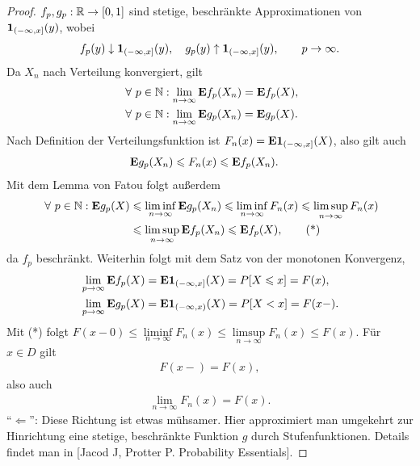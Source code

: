 \begin{proof}
$f_p,g_p: \mathbb{R}\to[0,1]$ sind stetige, beschränkte Approximationen von
$\mathbf{1}_{(-\infty,x]}(y)$, wobei
\begin{align*}
f_p(y) \downarrow \mathbf{1}_{(-\infty,x]}(y),\quad
g_p(y) \uparrow \mathbf{1}_{(-\infty,x]}(y),\qquad
p\to\infty.
\end{align*}
Da $X_n$ nach Verteilung konvergiert, gilt
\begin{align*}
&\forall p\in\N : \lim\limits_{n\to\infty} \E f_p(X_n) = \E f_p(X),\\
&\forall p\in\N : \lim\limits_{n\to\infty} \E g_p(X_n) = \E g_p(X).
\end{align*}
Nach Definition der Verteilungsfunktion ist $F_n(x)= \textbf{E} \mathbf{1}_{(-\infty,x]}(X)$,
also gilt auch
\begin{align*}
&\textbf{E} g_p(X_n)\leqslant F_n(x) \leqslant \textbf{E} f_p(X_n).
\end{align*}
Mit dem Lemma von Fatou folgt außerdem
\begin{align*}
\forall p\in\N : \E g_p(X) &\le \liminf\limits_{n\to\infty} \E g_p(X_n) \le
\liminf\limits_{n\to\infty} F_n(x) \le \limsup\limits_{n\to\infty} F_n(x)\\
&\le \limsup\limits_{n\to\infty} \E f_p(X_n) \le \E f_p(X),\tag{*}
\end{align*}
da $f_p$ beschränkt. 
Weiterhin folgt mit dem Satz von der monotonen Konvergenz,
\begin{align*} 
&\lim\limits_{p\to\infty} \textbf{E} f_p(X) = \textbf{E} \mathbf{1}_{(-\infty,x]}(X) = P[X\leqslant x] =
F(x),\\
&\lim\limits_{p\to\infty} \textbf{E} g_p(X) = \textbf{E} \mathbf{1}_{(-\infty,x)}(X) = P[X < x] =
F(x-).
\end{align*}
Mit (*) folgt $F(x-0)\le\liminf\limits_{n\to\infty} F_n(x) \le
\limsup\limits_{n\to\infty} F_n(x) \le  F(x)$. Für $x\in D$ gilt
\begin{align*}
F(x-) = F(x),
\end{align*}
also auch
\begin{align*}
\lim\limits_{n\to\infty} F_n(x) = F(x).
\end{align*}
``$\Leftarrow$'': Diese Richtung ist etwas mühsamer. Hier approximiert man
umgekehrt zur Hinrichtung eine stetige, beschränkte Funktion $g$ durch
Stufenfunktionen. Details findet man in [Jacod J, Protter P. Probability Essentials].\qedhere
\end{proof}

